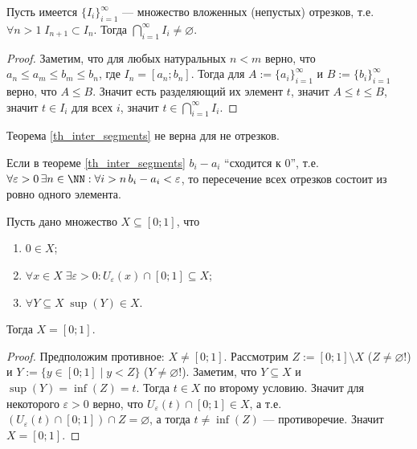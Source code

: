 \documentclass[12pt,a4paper]{article}
\begin{document}
    \begin{theorem}\label{th_inter_segments}
        Пусть имеется $\{I_i\}_{i=1}^\infty$ --- множество вложенных (непустых) отрезков, т.е. $\forall n > 1\; I_{n+1} \subset I_n$. Тогда $\bigcap_{i=1}^\infty I_i \neq \varnothing$.
    \end{theorem}

    \begin{proof}
        Заметим, что для любых натуральных $n < m$ верно, что $a_n \leqslant a_m \leqslant b_m \leqslant b_n$, где $I_n = [a_n;b_n]$. Тогда для $A:=\{a_i\}_{i=1}^\infty$ и $B:=\{b_i\}_{i=1}^\infty$ верно, что $A \leqslant B$. Значит есть разделяющий их элемент $t$, значит $A \leqslant t \leqslant B$, значит $t\in I_i$ для всех $i$, значит $t \in \bigcap_{i=1}^\infty I_i$.
    \end{proof}

    \begin{remark}
        Теорема \ref{th_inter_segments} не верна для не отрезков.
    \end{remark}

    \begin{remark}
        Если в теореме \ref{th_inter_segments} $b_i-a_i$ ``сходится к 0'', т.е. $\forall \varepsilon > 0\, \exists n\in\NN: \forall i > n\, b_i-a_i < \varepsilon$, то пересечение всех отрезков состоит из ровно одного элемента.
    \end{remark}

    \begin{theorem}
        Пусть дано множество $X \subseteq [0;1]$, что
        \begin{enumerate}
            \item $0 \in X$;
            \item $\forall x \in X\; \exists \varepsilon > 0: U_\varepsilon(x) \cap [0;1] \subseteq X$;
            \item $\forall Y \subseteq X\; \sup(Y) \in X$.
        \end{enumerate}
        Тогда $X = [0;1]$.
    \end{theorem}

    \begin{proof}
        Предположим противное: $X \neq [0;1]$. Рассмотрим $Z := [0;1] \setminus X$ ($Z \neq \varnothing$!) и $Y := \{y \in [0;1] \mid y < Z\}$ ($Y \neq \varnothing$!). Заметим, что $Y \subseteq X$ и $\sup(Y) = \inf(Z) = t$. Тогда $t \in X$ по второму условию. Значит для некоторого $\varepsilon > 0$ верно, что $U_{\varepsilon}(t) \cap [0;1] \in X$, а т.е. $(U_\varepsilon(t) \cap [0;1]) \cap Z = \varnothing$, а тогда $t \neq \inf(Z)$ --- противоречие. Значит $X = [0;1]$.
    \end{proof}
\end{document}
